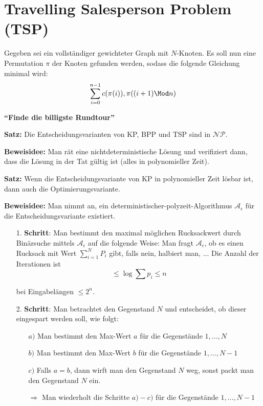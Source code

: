 \documentclass{scrartcl}%
\begin{document}
    \section*{Travelling Salesperson Problem (TSP)}
    Gegeben sei ein vollständiger gewichteter Graph mit $N$-Knoten. Es soll nun eine Permutation $\pi$ der Knoten gefunden werden, sodass die folgende Gleichung minimal wird:
    \begin{equation*}
        \sum_{i=0}^{n-1} c(\pi(i)), \pi((i+1)\Mod n)
    \end{equation*}

    \textsf{\textbf{"`Finde die billigste Rundtour"'}}

    \vspace*{0.3cm}
    \textbf{\textsf{Satz:}} Die Entscheidungsvarianten von KP, BPP und TSP sind in $\mathcal{N}\mathcal{P}$.

    \vspace*{0.3cm}
    \textbf{\textsf{Beweisidee:}} Man rät eine nichtdeterministische Lösung und verifiziert dann, dass die Lösung in der Tat gültig ist (alles in polynomieller Zeit).

    \vspace*{0.3cm}
    \textbf{\textsf{Satz:}} Wenn die Entscheidungsvariante von KP in polynomieller Zeit lösbar ist, dann auch die Optimierungsvariante.

    \vspace*{0.3cm}
    \textbf{\textsf{Beweisidee:}} Man nimmt an, ein deterministischer-polyzeit-Algorithmus $\mathcal{A}_{\epsilon}$ für die Entscheidungsvariante existiert.
    \begin{itemize}
        \item []{1. \textbf{\textsf{Schritt}}: Man bestimmt den maximal möglichen Rucksackwert durch Binärsuche mittels $\mathcal{A}_\epsilon$ auf die folgende Weise:
        Man fragt $\mathcal{A}_\epsilon$, ob es einen Rucksack mit Wert $\sum_{i=1}^{N} P_i$ gibt, falls nein, halbiert man, $\dots$ Die Anzahl der Iterationen ist
        \begin{equation*}
            \leq \log \sum p_i \leq n
        \end{equation*}

        bei Eingabelängen $\leq 2^n$.
        }
        \newpage
        \item []{2. \textbf{\textsf{Schritt}}: Man betrachtet den Gegenstand $N$ und entscheidet, ob dieser eingespart werden soll, wie folgt:
        \begin{itemize}
            \item [$a)$] Man bestimmt den Max-Wert $a$ für die Gegenstände $1, \dots, N$
            \item [$b)$] Man bestimmt den Max-Wert $b$ für die Gegenstände $1, \dots, N-1$
            \item [$c)$] Falls $a=b$, dann wirft man den Gegenstand $N$ weg, sonst packt man den Gegenstand $N$ ein.
            \item [$\Rightarrow$] Man wiederholt die Schritte $a)-c)$ für die Gegenstände $1, \dots, N-1$
        \end{itemize}
        }
    \end{itemize}
\end{document}
